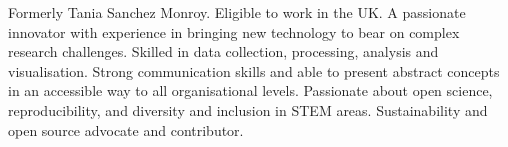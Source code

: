 
 \vspace{-6pt}

\begin{cvpubs}
  \cvpub
    {
      \begin{cvlist}
  \item {Formerly Tania Sanchez Monroy. Eligible to work
in the UK.
A passionate innovator with experience in bringing new technology to bear on
complex research challenges. Skilled in data collection, processing, analysis and visualisation.
Strong communication skills and able to present abstract
concepts in an accessible way to all organisational levels.
Passionate about open science, reproducibility, and diversity and inclusion in STEM areas. Sustainability and open source advocate and contributor.}
      \end{cvlist}
    }
\vspace{-11pt}
\end{cvpubs}